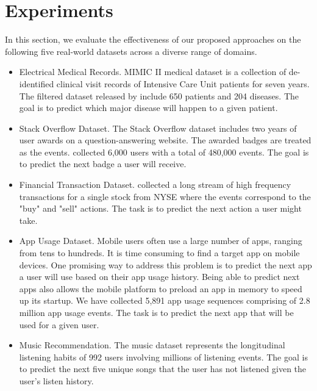 \documentclass{article} %
\begin{document}
 \section{Experiments}
In this section, we evaluate the effectiveness of our proposed approaches on the following five real-world datasets across a diverse range of domains.
\begin{itemize}
\item Electrical Medical Records. MIMIC II medical dataset
is a collection of de-identified clinical visit records of Intensive
Care Unit patients for seven years. The filtered dataset released by \citep{DuDaiTri16} include 650 patients and 204 diseases. The goal is to predict which major disease will happen to a given patient.
\item Stack Overflow Dataset. The Stack Overflow dataset includes two years of user awards on a question-answering website. The awarded badges are treated as the events. \citep{DuDaiTri16} collected 6,000 users with a total of 480,000 events. The goal is to predict the next badge a user will receive.
\item Financial Transaction Dataset. \citep{DuDaiTri16} collected a long stream of high frequency transactions for a single stock from NYSE where the events correspond to the "buy" and "sell" actions. The task is to predict the next action a user might take.
\item App Usage Dataset. Mobile users often use a large number of apps, ranging from tens to hundreds. It is time consuming to find a target app on mobile devices. One promising way to address this problem is to predict the next app a user will use based on their app usage history. Being able to predict next apps also allows the mobile platform to preload an app in memory to speed up its startup. We have collected 5,891 app usage sequences comprising of 2.8 million app usage events. The task is to predict the next app that will be used for a given user.
\item Music Recommendation. The music dataset represents the longitudinal listening habits of 992 users \citep{lastfm, Celma:Springer2010} involving millions of listening events. The goal is to predict the next five unique songs that the user has not listened given the user's listen history.

\end{itemize}
\end{document}
